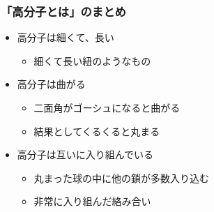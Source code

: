 \documentclass[12pt, dvipdfmx]{beamer}
\begin{document}
\begin{frame}
	\frametitle{「高分子とは」のまとめ}
        \begin{boxnote}
            \vspace{-3mm}
            \begin{itemize}
                \item 高分子は細くて、長い
                    \begin{itemize}
                        \item 細くて長い紐のようなもの
                    \end{itemize} 
                \item 高分子は曲がる
                    \begin{itemize}
                        \item 二面角がゴーシュになると曲がる
                        \item 結果としてくるくると丸まる
                    \end{itemize} 
                \item 高分子は互いに入り組んでいる
                    \begin{itemize}
                        \item 丸まった球の中に他の鎖が多数入り込む
                        \item 非常に入り組んだ絡み合い
                    \end{itemize}
            \end{itemize}
        \end{boxnote}
\end{frame}
\end{document}
